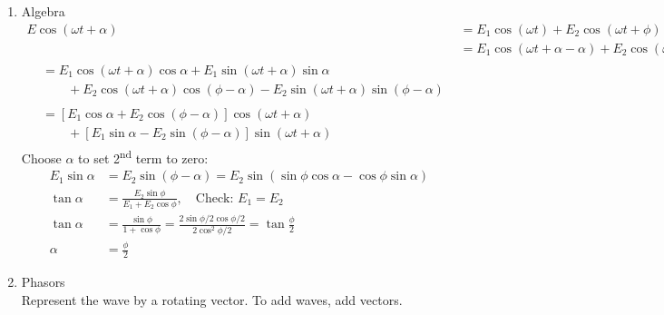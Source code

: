 \documentclass[a4paper, 11pt, normalem]{report}
\begin{document}
\begin{enumerate}
    \item Algebra
        \begin{align}
            E\cos{(\omega t + \alpha)} &= E_{1}\cos{(\omega t)} + E_{2}\cos{(\omega t + \phi)} \\
                                       &= E_{1}\cos{(\omega t + \alpha - \alpha)} + E_{2}\cos{(\omega t + \alpha + \phi - \alpha)} \\
            \begin{split} &=E_{1}\cos{(\omega t + \alpha)}\cos{\alpha} + E_{1}\sin{(\omega t + \alpha)}\sin{\alpha} \\ &\qquad + E_{2}\cos{(\omega t + \alpha)}\cos{(\phi - \alpha)} - E_{2}\sin{(\omega t + \alpha)}\sin{(\phi - \alpha)}\end{split} \\
            \begin{split}&= [E_{1}\cos{\alpha} + E_{2}\cos{(\phi - \alpha)}]\cos{(\omega t + \alpha)} \\ & \qquad+[E_{1}\sin{\alpha} - E_{2}\sin{(\phi - \alpha)}]\sin{(\omega t + \alpha)}\end{split}
        \end{align}
        Choose $\alpha$ to set 2\textsuperscript{nd} term to zero:
        \begin{align}
            E_{1}\sin{\alpha} &= E_{2}\sin{(\phi - \alpha)} = E_{2}\sin{(\sin{\phi}\cos{\alpha} - \cos{\phi}\sin{\alpha})} \\
            \tan{\alpha} &= \frac{E_{2}\sin{\phi}}{E_{1} + E_{2}\cos{\phi}},\quad \text{Check: } E_{1} = E_{2}\\
            \tan{\alpha} &= \frac{\sin{\phi}}{1 + \cos{\phi}} = \frac{2\sin{\phi/2}\cos{\phi/2}}{2\cos^{2}{\phi/2}} = \tan{\frac{\phi}{2}} \\
            \alpha &= \frac{\phi}{2}
        \end{align}
    \item Phasors \\
        Represent the wave by a rotating vector.
        To add waves, add vectors.
        \begin{figure}[H]
            \centering

\end{figure}
\end{enumerate}
\end{document}
